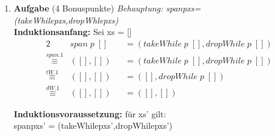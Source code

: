 \documentclass[11pt]{article}
\newcommand{\bonuspunkte}[1]{{\small{ }(#1 Bonuspunkte)}}
\newcommand{\aufgabe}[1]{\item{\bf #1}}
\begin{document}
\begin{enumerate}
\vspace*{0.5cm}
\textbf{Induktionsvoraussetzung:} für xs' gilt:\\
h\phantom{.}x\phantom{.}(foldl\phantom{.}g\phantom{.}y\phantom{.}xs') = foldl\phantom{.}g\phantom{.}(h\phantom{.}x\phantom{.}y)\phantom{.}xs'\\

\vspace*{0.5cm}
\textbf{Indukionsschritt:} Sei xs = (z:xs')
\begin{alignat*}{2}
&h\phantom{.}x\phantom{.}(foldl\phantom{.}g\phantom{.}y\phantom{.}(z:xs'))&&=foldl\phantom{.}g\phantom{.}(h\phantom{.}x\phantom{.}y)\phantom{.}(z:xs')\\
\stackrel{foldl.2}{\equiv}&h\phantom{.}x\phantom{.}(foldl\phantom{.}g\phantom{.}(g\phantom{.}y\phantom{.}z)\phantom{.}xs')&&=foldl\phantom{.}g\phantom{.}(g\phantom{.}(h\phantom{.}x\phantom{.}y)\phantom{.}z)\phantom{.}xs'\\
\equiv\phantom{.}&h\phantom{.}x\phantom{.}(foldl\phantom{.}g\phantom{.}(g\phantom{.}y\phantom{.}z)\phantom{.}xs')&&= foldl\phantom{.}g\phantom{.}(h\phantom{.}x\phantom{.}(g\phantom{.}y\phantom{.}z))\phantom{.}xs'\\
&\text{Ab\phantom{.}hier\phantom{.}weiß\phantom{.}ich\phantom{.}auch\phantom{.}nicht\phantom{.}mehr\phantom{.}weiter}
\end{alignat*}
\vspace*{0.5cm}
\textbf{Das bedeutet, dass die Behauptung für alle xs (endliche Listen) gilt.}

 \aufgabe{Aufgabe}\bonuspunkte{4}
\vspace*{0.5cm}
\textit{Behauptung: span\phantom{.}p\phantom{.}xs=(takeWhile\phantom{.}p\phantom{.}xs,dropWhle\phantom{.}p\phantom{.}xs)}\\
\textbf{Induktionsanfang:} Sei xs = []
\begin{alignat*}{2}
&span\phantom{.}p\phantom{.}[]&&=(takeWhile\phantom{.}p\phantom{.}[],dropWhile\phantom{.}p\phantom{.}[])\\
\stackrel{span.1}{\equiv}&([],[])&&=(takeWhile\phantom{.}p\phantom{.}[],dropWhile\phantom{.}p\phantom{.}[])\\
\stackrel{tW.1}{\equiv}&([],[])&&=([],dropWhile\phantom{.}p\phantom{.}[])\\
\stackrel{dW.1}{\equiv}&([],[])&&=([],[])
\end{alignat*}

\vspace*{0.5cm}
\textbf{Induktionsvoraussetzung:} für xs' gilt:\\
span\phantom{.}p\phantom{.}xs' = (takeWhile\phantom{.}p\phantom{.}xs',dropWhile\phantom{.}p\phantom{.}xs')\\


\end{enumerate}
\end{document}
